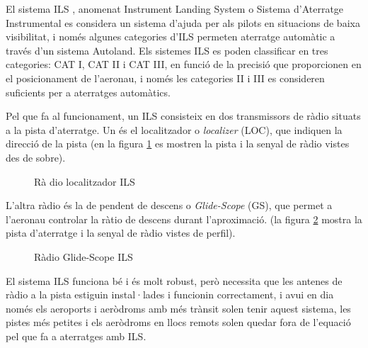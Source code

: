 \documentclass[10pt,a4paper,twocolumn,twoside]{article}
\begin{document}
El sistema ILS \cite{sauta2019instrumental}, anomenat Instrument Landing System o Sistema d'Aterratge Instrumental es considera un sistema d'ajuda per als pilots en situacions de baixa visibilitat, i només algunes categories d'ILS permeten aterratge automàtic a través
d'un sistema Autoland.
Els sistemes ILS es poden classificar en tres categories: CAT I, CAT II i CAT III,
en funció de la precisió que proporcionen en el posicionament de l'aeronau, i només
les categories II i III es consideren suficients per a aterratges automàtics.

Pel que fa al funcionament, un ILS consisteix en dos transmissors de ràdio situats
a la pista d'aterratge. Un és el localitzador o \textit{localizer} (LOC), que 
indiquen la direcció de la pista (en la figura \ref{fig-ils-loc} es mostren la pista i la
senyal de ràdio vistes des de sobre).


\begin{figure}[!h]
\centering
{}
	\caption{Rà dio localitzador ILS}
	\label{fig-ils-loc}
\end{figure}

L'altra ràdio és la de pendent de descens o \textit{Glide-Scope} (GS), que permet a
l'aeronau controlar la ràtio de descens durant l'aproximació. (la figura \ref{fig-ils-gs} mostra la
pista d'aterratge i la senyal de ràdio vistes de perfil).

\begin{figure}[!h]
\centering
{}
	\caption{Ràdio Glide-Scope ILS}
	\label{fig-ils-gs}
\end{figure}

El sistema ILS funciona bé i és molt robust, però necessita que les antenes de ràdio
a la pista estiguin instal·lades i funcionin correctament, i avui en dia només els
aeroports i aeròdroms amb més trànsit solen tenir aquest sistema, les pistes més petites i els aeròdroms en llocs remots solen quedar fora de l'equació pel que fa a aterratges
amb ILS.
\end{document}
